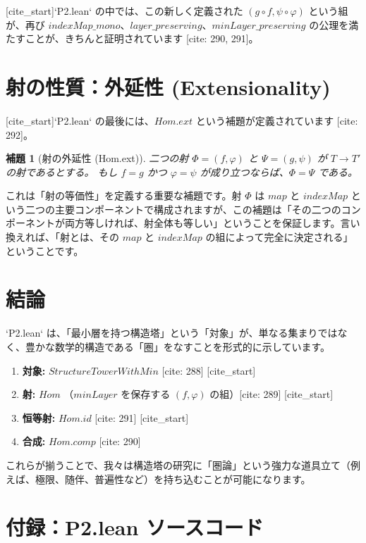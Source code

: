 \documentclass[11pt]{ltjsarticle}
\def\texttt#1{#1}%
\theoremstyle{definition}
\theoremstyle{plain}
\newtheorem{lemma}{補題}[section]
\theoremstyle{remark}
\begin{document}
[cite_start]`P2.lean` の中では、この新しく定義された $(g \circ f, \psi \circ \varphi)$ という組が、再び $\texttt{indexMap\_mono}$、$\texttt{layer\_preserving}$、$\texttt{minLayer\_preserving}$ の公理を満たすことが、きちんと証明されています [cite: 290, 291]。

\section{射の性質：外延性 (Extensionality)}

[cite_start]`P2.lean` の最後には、$\texttt{Hom.ext}$ という補題が定義されています [cite: 292]。

\begin{lemma}[射の外延性 (Hom.ext)]
二つの射 $\Phi = (f, \varphi)$ と $\Psi = (g, \psi)$ が $T \to T'$ の射であるとする。
もし $f = g$ かつ $\varphi = \psi$ が成り立つならば、$\Phi = \Psi$ である。
\end{lemma}

これは「射の等価性」を定義する重要な補題です。射 $\Phi$ は $\texttt{map}$ と $\texttt{indexMap}$ という二つの主要コンポーネントで構成されますが、この補題は「その二つのコンポーネントが両方等しければ、射全体も等しい」ということを保証します。言い換えれば、「射とは、その $\texttt{map}$ と $\texttt{indexMap}$ の組によって完全に決定される」ということです。

\section{結論}

`P2.lean` は、「最小層を持つ構造塔」という「対象」が、単なる集まりではなく、豊かな数学的構造である「圏」をなすことを形式的に示しています。
\begin{enumerate}
    \item \textbf{対象:} $\texttt{StructureTowerWithMin}$ [cite: 288]
    [cite_start]\item \textbf{射:} $\texttt{Hom}$ （$\texttt{minLayer}$ を保存する $(f, \varphi)$ の組）[cite: 289]
    [cite_start]\item \textbf{恒等射:} $\texttt{Hom.id}$ [cite: 291]
    [cite_start]\item \textbf{合成:} $\texttt{Hom.comp}$ [cite: 290]
\end{enumerate}
これらが揃うことで、我々は構造塔の研究に「圏論」という強力な道具立て（例えば、極限、随伴、普遍性など）を持ち込むことが可能になります。

\newpage
\appendix
\section{付録：P2.lean ソースコード}
\end{document}
